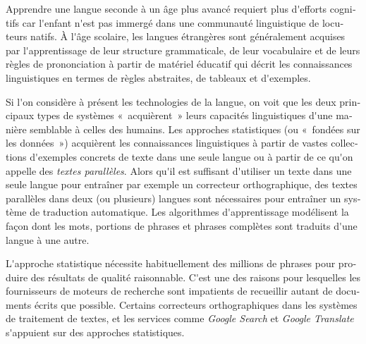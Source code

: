 \documentclass[]{../metanetpaper}
\begin{document}
\begin{french}
\begin{multicols}{2}
Apprendre une langue seconde à un âge plus avancé requiert plus
d{\mbox '}efforts cognitifs car l{\mbox '}enfant n{\mbox '}est pas
immergé dans une communauté linguistique de locuteurs natifs. À
l{\mbox '}âge scolaire, les langues étrangères sont généralement
acquises par l{\mbox '}apprentissage de leur structure grammaticale,
de leur vocabulaire et de leurs règles de prononciation à partir de
matériel éducatif qui décrit les connaissances linguistiques en termes
de règles abstraites, de tableaux et d{\mbox '}exemples.


Si l{\mbox '}on considère à présent les technologies de la langue, on
voit que les deux principaux types de systèmes «~acquièrent~» leurs
capacités linguistiques d{\mbox '}une manière semblable à celles des
humains. Les approches statistiques (ou «~fondées sur les données~»)
acquièrent les connaissances linguistiques à partir de vastes
collections d{\mbox '}exemples concrets de texte dans une seule langue
ou à partir de ce qu{\mbox '}on appelle des {\em textes
  parallèles}. Alors qu{\mbox '}il est suffisant d{\mbox '}utiliser un
texte dans une seule langue pour entraîner par exemple un correcteur
orthographique, des textes parallèles dans deux (ou plusieurs) langues
sont nécessaires pour entraîner un système de traduction
automatique. Les algorithmes d{\mbox '}apprentissage modélisent la
façon dont les mots, portions de phrases et phrases complètes sont
traduits d{\mbox '}une langue à une autre.

L{\mbox '}approche statistique nécessite habituellement des millions
de phrases pour produire des résultats de qualité raisonnable. C{\mbox
 '}est une des raisons pour lesquelles les fournisseurs de moteurs de
recherche sont impatients de recueillir autant de documents écrits que
possible. Certains correcteurs orthographiques dans les systèmes de
traitement de textes, et les services comme {\it Google Search} et
{\it Google Translate} s{\mbox '}appuient sur des approches
statistiques.


\end{multicols}
\end{french}
\end{document}

